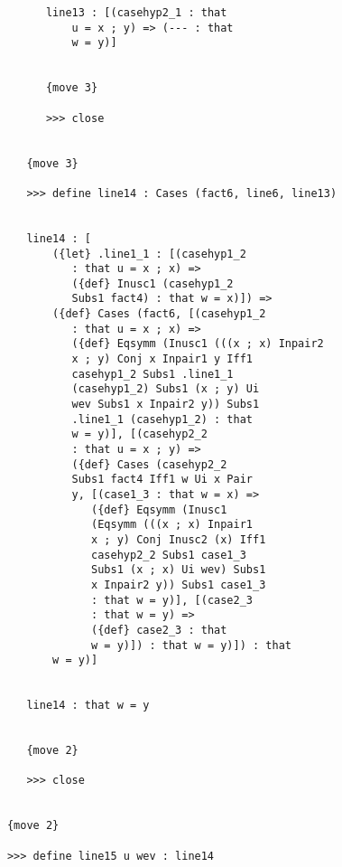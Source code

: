 \documentclass[12pt]{article}
\begin{document}
\begin{verbatim}
            line13 : [(casehyp2_1 : that 
                u = x ; y) => (--- : that 
                w = y)]


            {move 3}

            >>> close


         {move 3}

         >>> define line14 : Cases (fact6, line6, line13)


         line14 : [
             ({let} .line1_1 : [(casehyp1_2 
                : that u = x ; x) => 
                ({def} Inusc1 (casehyp1_2 
                Subs1 fact4) : that w = x)]) => 
             ({def} Cases (fact6, [(casehyp1_2 
                : that u = x ; x) => 
                ({def} Eqsymm (Inusc1 (((x ; x) Inpair2 
                x ; y) Conj x Inpair1 y Iff1 
                casehyp1_2 Subs1 .line1_1 
                (casehyp1_2) Subs1 (x ; y) Ui 
                wev Subs1 x Inpair2 y)) Subs1 
                .line1_1 (casehyp1_2) : that 
                w = y)], [(casehyp2_2 
                : that u = x ; y) => 
                ({def} Cases (casehyp2_2 
                Subs1 fact4 Iff1 w Ui x Pair 
                y, [(case1_3 : that w = x) => 
                   ({def} Eqsymm (Inusc1 
                   (Eqsymm (((x ; x) Inpair1 
                   x ; y) Conj Inusc2 (x) Iff1 
                   casehyp2_2 Subs1 case1_3 
                   Subs1 (x ; x) Ui wev) Subs1 
                   x Inpair2 y)) Subs1 case1_3 
                   : that w = y)], [(case2_3 
                   : that w = y) => 
                   ({def} case2_3 : that 
                   w = y)]) : that w = y)]) : that 
             w = y)]


         line14 : that w = y


         {move 2}

         >>> close


      {move 2}

      >>> define line15 u wev : line14



\end{verbatim}
\end{document}
